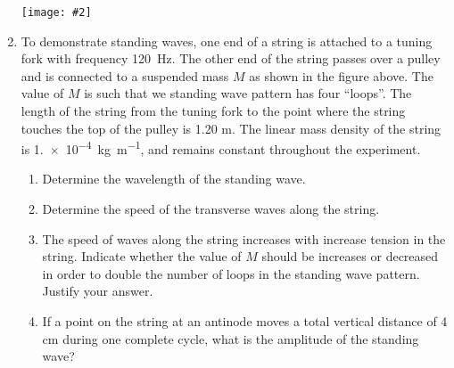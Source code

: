 \documentclass[11pt]{article}
\newcommand{\pic}[2]{
  \begin{center}\texttt{[image: \#2]}\end{center}
}
\begin{document}
\begin{enumerate}[leftmargin=18pt]
  \pic{.8}{tuning-fork}
\item To demonstrate standing waves, one end of a string is attached to a
  tuning fork with frequency \SI{120}{\hertz}. The other end of the string
  passes over a pulley and is connected to a suspended mass $M$ as shown in the
  figure above. The value of $M$ is such that we standing wave pattern has four
  ``loops''. The length of the string from the tuning fork to the point where
  the string touches the top of the pulley is 1.20 m. The linear mass density
  of the string is \SI{1.e-4}{\kilo\gram\per\metre}, and remains constant
  throughout the experiment.
  \begin{enumerate}[leftmargin=18pt]
  \item Determine the wavelength of the standing wave.
  \item Determine the speed of the transverse waves along the string.
    \newpage
  \item The speed of waves along the string increases with increase tension in
    the string. Indicate whether the value of $M$ should be increases or
    decreased in order to double the number of loops in the standing wave
    pattern. Justify your answer.
  \item If a point on the string at an antinode moves a total vertical distance
    of 4 cm during one complete cycle, what is the amplitude of the standing
    wave?
  \end{enumerate}
\end{enumerate}
\end{document}
